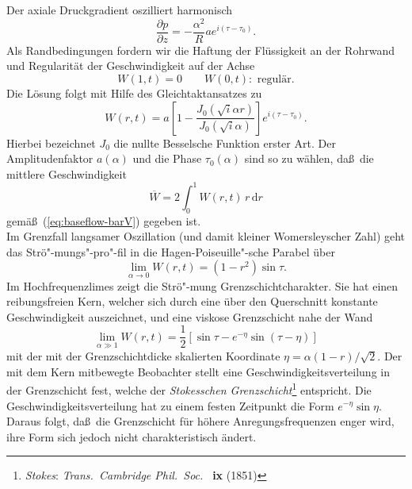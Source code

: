 \documentclass[10pt,a5paper,oneside,draft]{book}
\numberwithin{equation}{chapter}
\begin{document}
Der axiale Druckgradient oszilliert harmonisch
\begin{equation}
	 \frac{\partial{p}}{\partial z} = -\frac{\alpha^2}{R} a e^{i(\tau - \tau_0)}.
\end{equation}
Als Randbedingungen fordern wir die Haftung der Fl\"ussigkeit an der Rohrwand und Regularit\"at der Geschwindigkeit auf der Achse
\begin{equation}\label{eq:randi}
	W(1,t) = 0\qquad W(0,t):\textrm{ regul\"ar}.
\end{equation}
Die L\"osung folgt mit Hilfe des Gleichtaktansatzes zu
\begin{equation}\label{eq:baseflow}
	W(r,t) = a \left[ 1 - \frac{J_0 \left(\sqrt i \alpha r\right)}{J_0\left(\sqrt i \alpha\right) } \right] e^{i(\tau-\tau_0)}.
\end{equation}
Hierbei bezeichnet $J_0$ die nullte Besselsche Funktion erster Art.
Der Amplitudenfaktor $a(\alpha)$ und die Phase $\tau_0(\alpha)$ sind so zu w\"ahlen, da\ss\ die mittlere Geschwindigkeit
\begin{equation}
	\overline{W} = 2\int_0^1 W(r,t) \,r \,\mathrm{d} r
\end{equation}
gem\"a\ss\ (\mbox{\ref{eq:baseflow-barV}}) gegeben ist.\\
Im Grenzfall langsamer Oszillation (und damit kleiner Womersleyscher Zahl) geht das Str\"o"-mungs"-pro"-fil in die Hagen-Poiseuille"-sche Parabel \"uber
\begin{equation}\label{eq:hagen-poiseuille}
	\lim_{\alpha\to 0} W(r,t) = \left(1-r^2\right) \sin \tau.
\end{equation}
Im Hochfrequenzlimes zeigt die Str\"o"-mung Grenzschichtcharakter.
Sie hat einen reibungsfreien Kern, welcher sich durch eine \"uber den Querschnitt konstante Geschwindigkeit auszeichnet, und eine viskose Grenzschicht nahe der Wand
\begin{equation}
	\lim_{\alpha \gg 1} W(r,t) = \frac{1}{2} \left[ \sin\tau - e^{-\eta}\sin(\tau-\eta) \right]
\end{equation}
mit der mit der Grenzschichtdicke skalierten Koordinate $\eta = \alpha(1-r)/\sqrt{2}$.
Der mit dem Kern mitbewegte Beobachter stellt eine Geschwindigkeitsverteilung in der Grenzschicht fest, welche der \textit{Stokesschen Grenzschicht}\footnote{\label{bib:stokes}\textsl{Stokes}: \textit{Trans.\ Cambridge Phil.\ Soc.\ } \textbf{ix} (1851)} entspricht.
Die Geschwindigkeitsverteilung hat zu einem festen Zeitpunkt die Form $e^{-\eta} \sin \eta$.
Daraus folgt, da\ss\ die Grenzschicht f\"ur h\"ohere Anregungsfrequenzen enger wird, ihre Form sich jedoch nicht charakteristisch \"andert.\\
\end{document}
